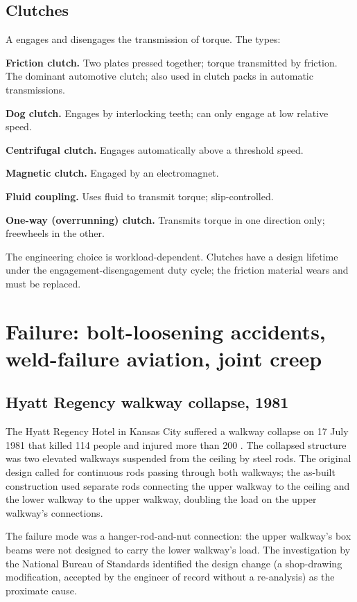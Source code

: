 \subsection{Clutches}

A  engages and disengages the transmission of torque. The types:

\textbf{Friction clutch.} Two plates pressed together; torque transmitted by friction. The dominant automotive clutch; also used in clutch packs in automatic transmissions.

\textbf{Dog clutch.} Engages by interlocking teeth; can only engage at low relative speed.

\textbf{Centrifugal clutch.} Engages automatically above a threshold speed.

\textbf{Magnetic clutch.} Engaged by an electromagnet.

\textbf{Fluid coupling.} Uses fluid to transmit torque; slip-controlled.

\textbf{One-way (overrunning) clutch.} Transmits torque in one direction only; freewheels in the other.

The engineering choice is workload-dependent. Clutches have a design lifetime under the engagement-disengagement duty cycle; the friction material wears and must be replaced.

\section{Failure: bolt-loosening accidents, weld-failure aviation, joint creep}

\subsection{Hyatt Regency walkway collapse, 1981}

The Hyatt Regency Hotel in Kansas City suffered a walkway collapse on 17 July 1981 that killed 114 people and injured more than 200 \cite{acc:nbs-hyatt-1982}. The collapsed structure was two elevated walkways suspended from the ceiling by steel rods. The original design called for continuous rods passing through both walkways; the as-built construction used separate rods connecting the upper walkway to the ceiling and the lower walkway to the upper walkway, doubling the load on the upper walkway's connections.

The failure mode was a hanger-rod-and-nut connection: the upper walkway's box beams were not designed to carry the lower walkway's load. The investigation by the National Bureau of Standards \cite{acc:nbs-hyatt-1982} identified the design change (a shop-drawing modification, accepted by the engineer of record without a re-analysis) as the proximate cause.

